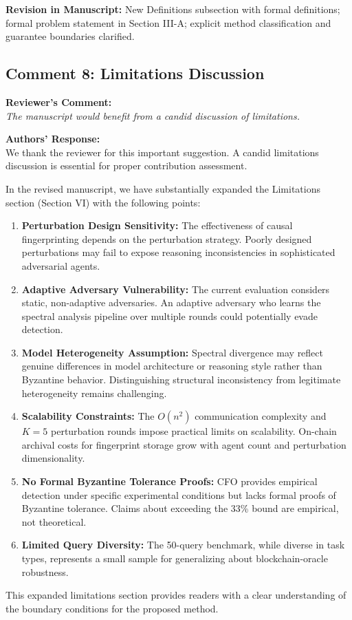 \documentclass[11pt,a4paper]{article}
\newcommand{\reviewercomment}[1]{%
  \vspace{6pt}\noindent\textbf{\textcolor{reviewercolor}{Reviewer's Comment:}}\\
  \textcolor{reviewercolor}{\itshape #1}\vspace{4pt}}
\newcommand{\response}[1]{%
  \noindent\textbf{\textcolor{responsecolor}{Authors' Response:}}\\
  #1\vspace{8pt}}
\newcommand{\revision}[1]{%
  \noindent\textbf{Revision in Manuscript:} #1\vspace{4pt}}
\begin{document}
\revision{New Definitions subsection with formal definitions; formal problem statement in Section III-A; explicit method classification and guarantee boundaries clarified.}

\subsection*{Comment 8: Limitations Discussion}

\reviewercomment{The manuscript would benefit from a candid discussion of limitations.}

\response{We thank the reviewer for this important suggestion. A candid limitations discussion is essential for proper contribution assessment.

In the revised manuscript, we have substantially expanded the Limitations section (Section VI) with the following points:

\begin{enumerate}[nosep]
\item \textbf{Perturbation Design Sensitivity:} The effectiveness of causal fingerprinting depends on the perturbation strategy. Poorly designed perturbations may fail to expose reasoning inconsistencies in sophisticated adversarial agents.

\item \textbf{Adaptive Adversary Vulnerability:} The current evaluation considers static, non-adaptive adversaries. An adaptive adversary who learns the spectral analysis pipeline over multiple rounds could potentially evade detection.

\item \textbf{Model Heterogeneity Assumption:} Spectral divergence may reflect genuine differences in model architecture or reasoning style rather than Byzantine behavior. Distinguishing structural inconsistency from legitimate heterogeneity remains challenging.

\item \textbf{Scalability Constraints:} The $O(n^2)$ communication complexity and $K=5$ perturbation rounds impose practical limits on scalability. On-chain archival costs for fingerprint storage grow with agent count and perturbation dimensionality.

\item \textbf{No Formal Byzantine Tolerance Proofs:} CFO provides empirical detection under specific experimental conditions but lacks formal proofs of Byzantine tolerance. Claims about exceeding the 33\% bound are empirical, not theoretical.

\item \textbf{Limited Query Diversity:} The 50-query benchmark, while diverse in task types, represents a small sample for generalizing about blockchain-oracle robustness.
\end{enumerate}

This expanded limitations section provides readers with a clear understanding of the boundary conditions for the proposed method.}
\end{document}

